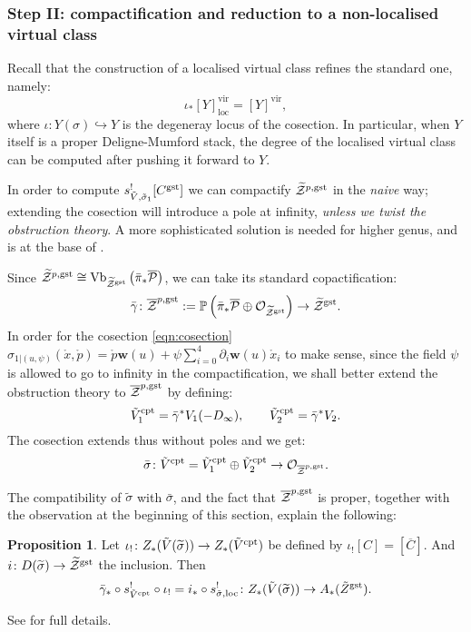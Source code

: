 \documentclass[11pt]{amsart}
\newcommand{\pazocal}{\mathcal}
\newcommand{\tZ}{\widetilde{\pazocal Z}}
\newcommand{\oZp}{\overline{\mathcal Z}^{p,\rm{gst}}}
\newcommand{\PP}{\mathbb P}
\newcommand{\OO}{\mathcal{O}}
\renewcommand{\to}{\rightarrow}
\newcommand{\virt}[1]{[#1]^{\mathrm{vir}}}
\newcommand{\virloc}[1]{[#1]^{\mathrm{vir}}_{\mathrm{loc}}}
\newcommand{\w}{\mathbf{w}}
\theoremstyle{definition}
\newtheorem{prop}[thm]{Proposition}
\theoremstyle{definition}
\begin{document}
\subsubsection{Step II: compactification and reduction to a non-localised virtual class}
Recall that the construction of a localised virtual class refines the standard one, namely:
\[\iota_*\virloc{Y}=\virt{Y},\]
where $\iota\colon Y(\sigma)\hookrightarrow Y$ is the degeneray locus of the cosection. In particular, when $Y$ itself is a proper Deligne-Mumford stack, the degree of the localised virtual class can be computed after pushing it forward to $Y$.

In order to compute $s^!_{\tilde V,\tilde\sigma_1}[C^{\rm{gst}}]$ we can compactify $\tZ^{p,\rm{gst}}$ in the \emph{naive} way; extending the cosection will introduce a pole at infinity, \emph{unless we twist the obstruction theory}. A more sophisticated solution is needed for higher genus, and is at the base of \cite{CJRS}.

Since $\tZ^{p,\rm{gst}}\cong\operatorname{Vb}_{\tZ^{\rm{gst}}}\left(\bar{\pi}_*\overline{\mathcal P}\right)$, we can take its standard copactification:
\[\bar{\gamma}\colon \overline{\mathcal Z}^{p,\rm{gst}}:=\PP\left(\bar{\pi}_*\overline{\mathcal P}\oplus \OO_{\tZ^{\rm{gst}}}\right)\to \tZ^{\rm{gst}}.\]
In order for the cosection \eqref{eqn:cosection}
$\sigma_{1|(u,\psi)}(\mathring{x},\mathring{p})=\mathring{p}\w(u)+\psi\sum_{i=0}^4\partial_i\w(u)\mathring{x}_i$
to make sense, since the field $\psi$ is allowed to go to infinity in the compactification, we shall better extend the obstruction theory to $\oZp$ by defining:
\[\tilde{V}^{\rm{cpt}}_1=\bar{\gamma}^*V_1(-D_{\infty}),\qquad \tilde{V}^{\rm{cpt}}_2=\bar{\gamma}^*V_2.\]
The cosection extends thus without poles and we get:
\[\bar{\sigma}\colon \tilde{V}^{\rm{cpt}}=\tilde{V}^{\rm{cpt}}_1\oplus \tilde{V}^{\rm{cpt}}_2\to\OO_{\oZp}. \]
 
 The compatibility of $\tilde\sigma$ with $\bar\sigma$, and the fact that $\oZp$ is proper, together with the observation at the beginning of this section, explain the following:
 \begin{prop}
 Let $\iota_{!}\colon Z_*(\tilde{V}(\widetilde{\sigma}))\to Z_*(\tilde{V}^{\rm{cpt}})$ be defined by 
 $\iota_{!}[C]=[\overline{C}].$ And $i\colon D(\widetilde{\sigma})\to \tZ^{\rm{gst}}$ the inclusion. Then
 \[\bar{\gamma}_*\circ s^{!}_{\tilde{V}^{\rm{cpt}}}\circ\iota_{!}=i_*\circ s^{!}_{\tilde\sigma,\rm{loc}}\colon  Z_*(\tilde{V}(\widetilde{\sigma}))\to A_*(\tilde{Z}^{\rm{gst}}).\]
 \end{prop}
 See \cite[Proposition~6.4]{CL} for full details.
 
\end{document}
